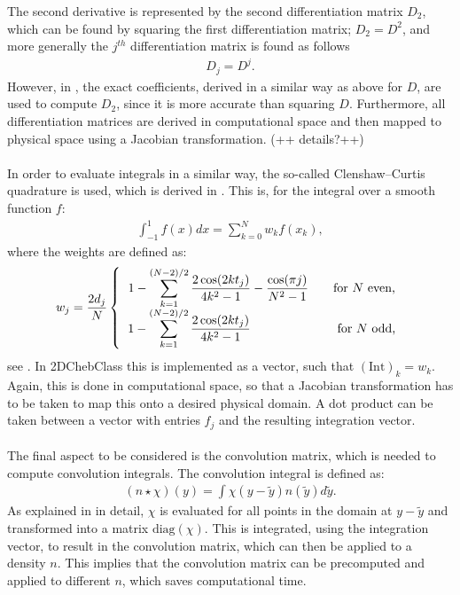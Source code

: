 \documentclass[11pt, a4paper]{article}
\theoremstyle{definition}
\begin{document}
The second derivative is represented by the second differentiation matrix $D_2$, which can be found by squaring the first differentiation matrix; $D_2=D^2$, and more generally the $j^{th}$ differentiation matrix is found as follows
\begin{align*}
	D_j=D^j.
\end{align*}
However, in \cite{GoddardPseudospectralCode1}, the exact coefficients, derived in a similar way as above for $D$, are used to compute $D_2$, since it is more accurate than squaring $D$. Furthermore, all differentiation matrices are derived in computational space and then mapped to physical space using a Jacobian transformation. (++ details?++)
\\
\\
In order to evaluate integrals in a similar way, the so-called Clenshaw--Curtis quadrature is used, which is derived in \cite{ClenCurt1}.
This is, for the integral over a smooth function $f$:
\begin{align}\label{eqnClenCurtQuad}
	\int_{-1}^1 f(x)dx = \sum_{k=0}^N w_kf(x_k),
\end{align}
where the weights are defined as:
\begin{align*}
	w_j = \frac{2d_j}{N}
	\left \{
	\begin{tabular}{c}
		$1- \displaystyle \sum_{k=1}^{(N-2)/2} \frac{2 \cos(2kt_j)}{4k^2-1} - \frac{\cos(\pi j)}{N^2 -1} \quad \quad\text{for $N$ even}$,\\
		$1- \displaystyle \sum_{k=1}^{(N-2)/2} \frac{2 \cos(2kt_j)}{4k^2-1} \quad \quad \quad \quad \quad \quad \ \ \ \text{for $N$ odd}$,
	\end{tabular}
	\right .
\end{align*}
see \cite{GoddardPseudospectralCode1}. In 2DChebClass this is implemented as a vector, such that $(\text{Int})_k = w_k$. Again, this is done in computational space, so that a Jacobian transformation has to be taken to map this onto a desired physical domain. A dot product can be taken between a vector with entries $f_j$ and the resulting integration vector. 
\\
\\
The final aspect to be considered is the convolution matrix, which is needed to compute convolution integrals. 
The convolution integral is defined as:
\begin{align*}
	\left(n \star \chi \right) (y) = \int \chi (y - \tilde y) n (\tilde y) d \tilde y.
\end{align*}
As explained in \cite{GoddardPseudospectralCode1} in detail, $\chi$ is evaluated for all points in the domain at $y - \tilde y$ and transformed into a matrix $\text{diag} \left(\chi\right)$. This is integrated, using the integration vector, to result in the convolution matrix, which can then be applied to a density $n$. This implies that the convolution matrix can be precomputed and applied to different $n$, which saves computational time. 
\end{document}
